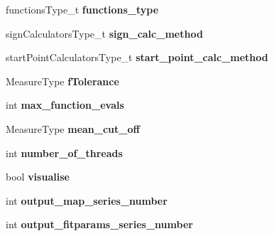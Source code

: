 \begin{DoxyCompactItemize}
\item 
\hypertarget{struct_ox_1_1_ox_shmolli2_options_ae321bfe9403fbcde62737d558cdf227c}{functions\-Type\-\_\-t {\bfseries functions\-\_\-type}}\label{struct_ox_1_1_ox_shmolli2_options_ae321bfe9403fbcde62737d558cdf227c}

\item 
\hypertarget{struct_ox_1_1_ox_shmolli2_options_a677f4fa89f71099635b8bb147b129914}{sign\-Calculators\-Type\-\_\-t {\bfseries sign\-\_\-calc\-\_\-method}}\label{struct_ox_1_1_ox_shmolli2_options_a677f4fa89f71099635b8bb147b129914}

\item 
\hypertarget{struct_ox_1_1_ox_shmolli2_options_a8fe270afa66a8e74b2037ab4f3352c41}{start\-Point\-Calculators\-Type\-\_\-t {\bfseries start\-\_\-point\-\_\-calc\-\_\-method}}\label{struct_ox_1_1_ox_shmolli2_options_a8fe270afa66a8e74b2037ab4f3352c41}

\item 
\hypertarget{struct_ox_1_1_ox_shmolli2_options_abcda28f7c6adfb4bba11c09976d2e039}{Measure\-Type {\bfseries f\-Tolerance}}\label{struct_ox_1_1_ox_shmolli2_options_abcda28f7c6adfb4bba11c09976d2e039}

\item 
\hypertarget{struct_ox_1_1_ox_shmolli2_options_a22acb422cb0d81d8312a39f52751fb3e}{int {\bfseries max\-\_\-function\-\_\-evals}}\label{struct_ox_1_1_ox_shmolli2_options_a22acb422cb0d81d8312a39f52751fb3e}

\item 
\hypertarget{struct_ox_1_1_ox_shmolli2_options_a7b572f1af3eacc663269126d736df8cd}{Measure\-Type {\bfseries mean\-\_\-cut\-\_\-off}}\label{struct_ox_1_1_ox_shmolli2_options_a7b572f1af3eacc663269126d736df8cd}

\item 
\hypertarget{struct_ox_1_1_ox_shmolli2_options_ad1985f4cf4c53a45e979859defded330}{int {\bfseries number\-\_\-of\-\_\-threads}}\label{struct_ox_1_1_ox_shmolli2_options_ad1985f4cf4c53a45e979859defded330}

\item 
\hypertarget{struct_ox_1_1_ox_shmolli2_options_a1698fc161a8670ade81cfde65e337707}{bool {\bfseries visualise}}\label{struct_ox_1_1_ox_shmolli2_options_a1698fc161a8670ade81cfde65e337707}

\item 
\hypertarget{struct_ox_1_1_ox_shmolli2_options_a94f71048e2c3953347230b1c2701197a}{int {\bfseries output\-\_\-map\-\_\-series\-\_\-number}}\label{struct_ox_1_1_ox_shmolli2_options_a94f71048e2c3953347230b1c2701197a}

\item 
\hypertarget{struct_ox_1_1_ox_shmolli2_options_a1f792a99603e64de904b36c916f2f5ee}{int {\bfseries output\-\_\-fitparams\-\_\-series\-\_\-number}}\label{struct_ox_1_1_ox_shmolli2_options_a1f792a99603e64de904b36c916f2f5ee}

\end{DoxyCompactItemize}


